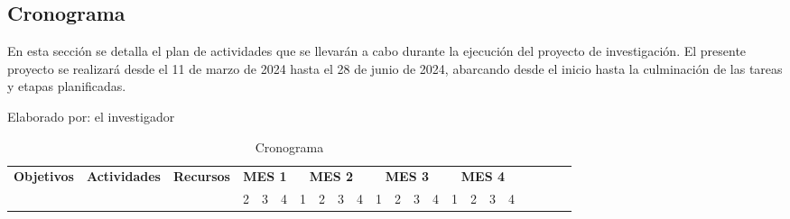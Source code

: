 \begin{landscape}
    \section{Cronograma}
    En esta sección se detalla el plan de actividades que se llevarán a cabo durante la ejecución del proyecto de
    investigación. El presente proyecto se realizará desde el 11 de marzo de 2024 hasta el 28 de junio de 2024,
    abarcando desde el inicio hasta la culminación de las tareas y etapas planificadas.
    \begin{ThreePartTable}
        \begin{TableNotes}[flushleft]
            \centering
            \item Elaborado por: el investigador
        \end{TableNotes}
        \begin{longtable}{|p{}|p{5.5cm}|p{4cm}|l|l|l|l|l|l|l|l|l|l|l|l|l|l|l|l|l|l|l|}
            \caption{Cronograma}
            \label{table:cronograma}                                                                                                                                                                                                                                                                                                                                                                                                                                                                                                                                                                                                                                                                     \\
            \hline
            \multirow{2}{*}{\bfseries Objetivos}                                & \multirow{2}{*}{\bfseries Actividades}                              & \multirow{2}{*}{\bfseries Recursos}                                                                                 & \multicolumn{3}{|c|}{\bfseries MES 1} & \multicolumn{4}{|c|}{\bfseries MES 2} & \multicolumn{4}{|c|}{\bfseries MES 3} & \multicolumn{4}{|c|}{\bfseries MES 4}                                                                                                                                                                                                                                                              \\
            \cline{4-21}
                                                                                &                                                                     &                                                                                                                     & 2                                     & 3                                     & 4                                     & 1                                     & 2                    & 3                    & 4                    & 1                    & 2                    & 3                    & 4                    & 1                    & 2                    & 3                    & 4                    \\

\end{longtable}
\end{ThreePartTable}
\end{landscape}
